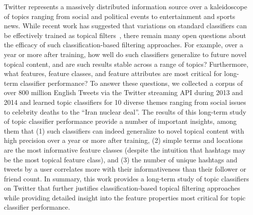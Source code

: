 
Twitter represents a massively distributed information source over a kaleidoscope of topics ranging from social and political events to entertainment and sports news.  While recent work has suggested that variations on standard classifiers can be effectively trained as topical filters~\cite{lin2011smoothing,yang2014large,magdy}, there remain many open questions about the efficacy of such classification-based filtering approaches.  For example, over a year or more after training, how well do such classifiers generalize to future novel topical content, and are such results stable across a range of topics?  Furthermore, what features, feature classes, and feature attributes are most critical for long-term classifier performance?  To answer these questions, we collected a corpus of over 800 million English Tweets via the Twitter streaming API during 2013 and 2014 and learned topic classifiers for 10 diverse themes ranging from social issues to celebrity deaths to the ``Iran nuclear deal''.  The results of this long-term study of topic classifier performance provide a number of important insights, among them that (1) such classifiers can indeed generalize to novel topical content with high precision over a year or more after training, (2) simple terms and locations are the most informative feature classes (despite the intuition that hashtags may be the most topical feature class), and (3) the number of unique hashtags and tweets by a user correlates more with their informativeness than their follower or friend count.  In summary, this work provides a long-term study of topic classifiers on Twitter that further justifies classification-based topical filtering approaches while providing detailed insight into the feature properties most critical for topic classifier performance.